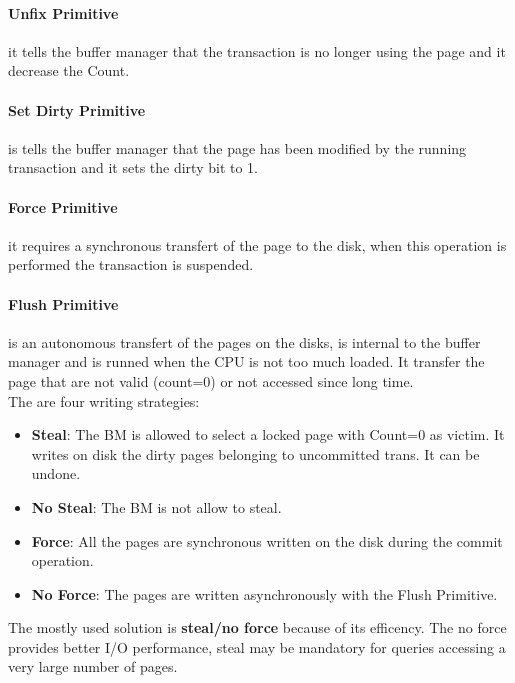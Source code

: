 \documentclass[12pt]{article}
\begin{document}
\paragraph{Unfix Primitive} it tells the buffer manager that the transaction is no longer using the page and it decrease the Count.
\paragraph{Set Dirty Primitive} is tells the buffer manager that the page has been modified by the running transaction and it sets the dirty bit to 1.
\paragraph{Force Primitive} it requires a synchronous transfert of the page to the disk, when this operation is performed the transaction is suspended.
\paragraph{Flush Primitive} is an autonomous transfert of the pages on the disks, is internal to the buffer manager and is runned when the CPU is not too much loaded. It transfer the page that are not valid (count=0) or not accessed since long time.\\
The are four writing strategies:
\begin{itemize}
  \item \textbf{Steal}: The BM is allowed to select a locked page with Count=0 as victim. It writes on disk the dirty pages belonging to uncommitted trans. It can be undone.
  \item \textbf{No Steal}: The BM is not allow to steal.
  \item \textbf{Force}: All the pages are synchronous written on the disk during the commit operation.
  \item \textbf{No Force}: The pages are written asynchronously with the Flush Primitive.
\end{itemize}
The mostly used solution is \textbf{steal/no force} because of its efficency. The no force provides better I/O performance, steal may be mandatory for queries accessing a very large number of pages.
\end{document}
